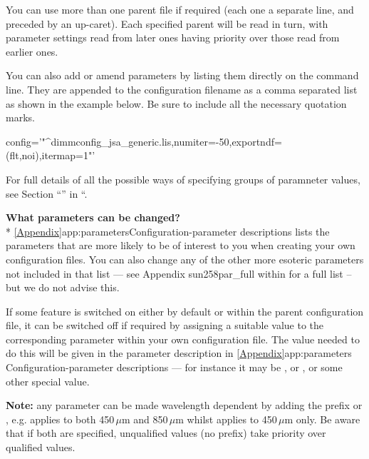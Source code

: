 You can use more than one parent file if required (each one a separate
line, and preceded by an up-caret). Each specified parent will be read in
turn, with parameter settings read from later ones having priority over
those read from earlier ones.

You can also add or amend parameters by listing them directly on the
command line. They are appended to the configuration filename as a
comma separated list as shown in the example below. Be sure to include
all the necessary quotation marks.

\begin{terminalv}
config='"^dimmconfig\_jsa\_generic.lis,numiter=-50,exportndf=(flt,noi),itermap=1"'
\end{terminalv}

For full details of all the possible ways of specifying groups of
paramneter values, see Section ``'' in ``.

\textbf{What parameters can be changed?}\\*
\cref{Appendix}{app:parameters}{Configuration-parameter descriptions}
lists the parameters that are more likely to be of interest to you when
creating your own configuration files. You can also change any of the
other more esoteric parameters not included in that list --- see
Appendix  {sun258}{par_full} within  for a full list -- but we do not advise this.

\begin{tip}
  If some feature is switched on either by default or within
  the parent configuration file, it can be switched off if required
  by assigning a suitable value to the corresponding parameter within
  your own configuration file. The value needed to do this will be
  given in the parameter description in \cref{Appendix}{app:parameters}
  {Configuration-parameter descriptions} --- for instance it may be
  , or , or some other special value.
\end{tip}

\textbf{Note:} any parameter can be made wavelength dependent by
adding the prefix  or , e.g.
 applies to both 450\,$\mu$m and
850\,$\mu$m whilst  applies to
450\,$\mu$m only. Be aware that if both are specified, unqualified
values (no prefix) take priority over qualified values.


